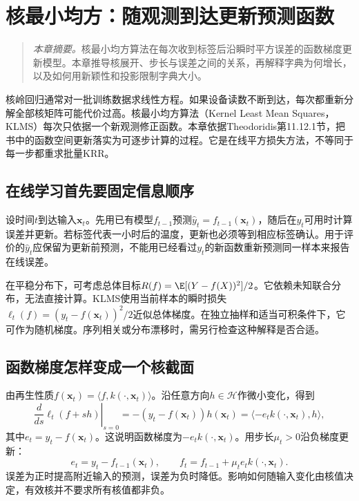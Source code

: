 \chapter{核最小均方：随观测到达更新预测函数}
\label{chap:klms}
\begin{quote}\small
\textit{本章摘要。}核最小均方算法在每次收到标签后沿瞬时平方误差的函数梯度更新模型。本章推导核展开、步长与误差之间的关系，再解释字典为何增长，以及如何用新颖性和投影限制字典大小。
\end{quote}

核岭回归通常对一批训练数据求线性方程。如果设备读数不断到达，每次都重新分解全部核矩阵可能代价过高。核最小均方算法（Kernel Least Mean Squares，KLMS）每次只依据一个新观测修正函数。本章依据Theodoridis第11.12.1节\cite{theodoridis2015ml}，把书中的函数空间更新落实为可逐步计算的过程。它是在线平方损失方法，不等同于每一步都重求批量KRR。

\section{在线学习首先要固定信息顺序}
设时间$t$到达输入$\bm x_t$。先用已有模型$f_{t-1}$预测$\hat y_t=f_{t-1}(\bm x_t)$，随后在$y_t$可用时计算误差并更新。若标签代表一小时后的温度，更新也必须等到相应标签确认。用于评价的$\hat y_t$应保留为更新前预测，不能用已经看过$y_t$的新函数重新预测同一样本来报告在线误差。

在平稳分布下，可考虑总体目标$R(f)=\E[(Y-f(X))^2]/2$。它依赖未知联合分布，无法直接计算。KLMS使用当前样本的瞬时损失$\ell_t(f)=(y_t-f(\bm x_t))^2/2$近似总体梯度。在独立抽样和适当可积条件下，它可作为随机梯度。序列相关或分布漂移时，需另行检查这种解释是否合适。

\section{函数梯度怎样变成一个核截面}
由再生性质$f(\bm x_t)=\langle f,k(\cdot,\bm x_t)\rangle$。沿任意方向$h\in\mathcal H$作微小变化，得到
\begin{equation}
 \left.\frac{d}{ds}\ell_t(f+sh)\right|_{s=0}
 =-(y_t-f(\bm x_t))h(\bm x_t)
 =\langle-e_t k(\cdot,\bm x_t),h\rangle,
\end{equation}
其中$e_t=y_t-f(\bm x_t)$。这说明函数梯度为$-e_t k(\cdot,\bm x_t)$。用步长$\mu_t>0$沿负梯度更新：
\begin{equation}
 e_t=y_t-f_{t-1}(\bm x_t),\qquad
 f_t=f_{t-1}+\mu_t e_t k(\cdot,\bm x_t).
 \label{eq:klms-update}
\end{equation}
误差为正时提高附近输入的预测，误差为负时降低。影响如何随输入变化由核值决定，有效核并不要求所有核值都非负。

